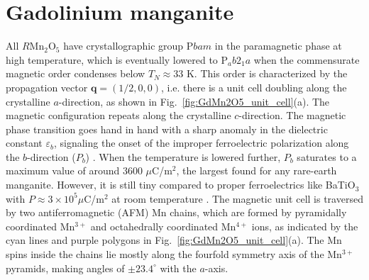 \section{Gadolinium manganite}
All $R$Mn$_2$O$_5$ have crystallographic group P$bam$ \cite{Alonso97} in the paramagnetic phase at high temperature, which is eventually lowered to P$_ab2_1a$ when the commensurate magnetic order condenses below $T_{N} \approx 33$ K.
This order is characterized by the propagation vector $\bm{q} = (1/2, 0, 0)$, i.e. there is a unit cell doubling along the crystalline $a$-direction, as shown in Fig.~\ref{fig:GdMn2O5_unit_cell}(a).
The magnetic configuration repeats along the crystalline $c$-direction. The magnetic phase transition goes hand in hand with a sharp anomaly in the dielectric constant $\varepsilon_b$, signaling the onset of the improper ferroelectric polarization  along the $b$-direction ($P_b$) \cite{Vecchini08,Lee13,Vecchini14}.
When the temperature is lowered further, $P_b$ saturates to a maximum value of around 3600 $\mu$C/m$^2$, the largest found for any rare-earth manganite.
However, it is still tiny compared to proper ferroelectrics like BaTiO$_3$ with $P \approx 3 \times 10^5 \mu $C/m$^2$ at room temperature \cite{Mason1948,VonHippel1950}.
The magnetic unit cell is traversed by two antiferromagnetic (AFM) Mn chains, which are formed by pyramidally coordinated Mn$^{3+}$ and octahedrally coordinated Mn$^{4+}$ ions, as indicated by the cyan lines and purple polygons in Fig.~\ref{fig:GdMn2O5_unit_cell}(a).
The Mn spins inside the chains lie mostly along the fourfold symmetry axis of the Mn$^{3+}$ pyramids, making angles of $\pm 23.4^\circ$ with the $a$-axis.

